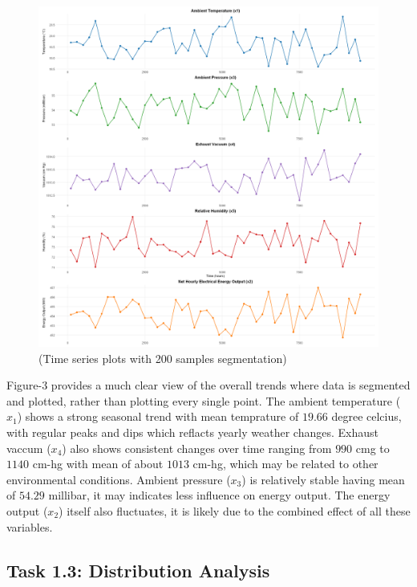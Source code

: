 \documentclass[12pt,a4paper]{article}
\begin{document}
\begin{figure}[H]
    \centering
    \includegraphics[width=\textwidth]{z5.png}
    \caption{(Time series plots with 200 samples segmentation)}
    \label{fig:time_series3}
\end{figure}

Figure-3 provides a much clear view of the overall trends where 
data is segmented and plotted, rather than plotting every single point.
The ambient temperature (\(x_1\)) shows a strong seasonal trend with mean temprature of $19.66$ degree celcius, with 
regular peaks and dips which reflacts yearly weather changes. Exhaust vaccum 
(\(x_4\)) also shows consistent changes over time ranging from $990$ cmg to $1140$ cm-hg with mean of about 
$1013$ cm-hg, which may be related to other environmental conditions.
Ambient pressure (\(x_3\)) is relatively stable having mean of $54.29$ millibar,  it may indicates 
less influence on energy output. The energy output (\(x_2\)) itself also fluctuates, it is likely due to 
the combined effect of all these variables.

\subsection*{Task 1.3: Distribution Analysis}
\end{document}
